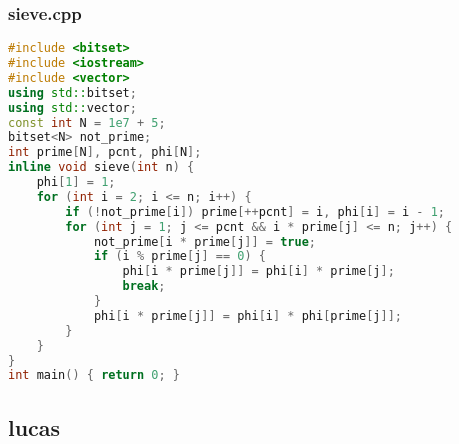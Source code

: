 \documentclass[9pt, a4paper, oneside]{book}
\begin{document}
\subsubsection{sieve.cpp}
\begin{lstlisting}[language={C++}]
#include <bitset>
#include <iostream>
#include <vector>
using std::bitset;
using std::vector;
const int N = 1e7 + 5;
bitset<N> not_prime;
int prime[N], pcnt, phi[N];
inline void sieve(int n) {
    phi[1] = 1;
    for (int i = 2; i <= n; i++) {
        if (!not_prime[i]) prime[++pcnt] = i, phi[i] = i - 1;
        for (int j = 1; j <= pcnt && i * prime[j] <= n; j++) {
            not_prime[i * prime[j]] = true;
            if (i % prime[j] == 0) {
                phi[i * prime[j]] = phi[i] * prime[j];
                break;
            }
            phi[i * prime[j]] = phi[i] * phi[prime[j]];
        }
    }
}
int main() { return 0; }\end{lstlisting}
\subsection{lucas}
\end{document}
